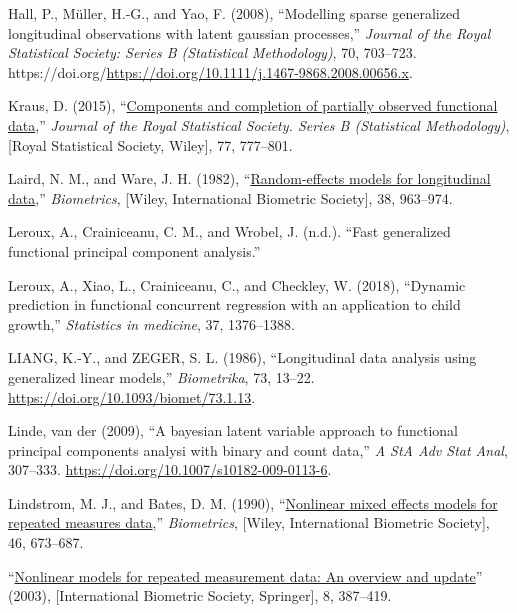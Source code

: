 \documentclass[
  11pt,
]{article}
\newlength{\cslhangindent}
\newlength{\cslentryspacingunit} %
\newenvironment{CSLReferences}[2] %
 {%
  \setlength{\parindent}{0pt}
  \ifodd #1
  \let\oldpar\par
  \def\par{\hangindent=\cslhangindent\oldpar}
  \fi
  \setlength{\parskip}{#2\cslentryspacingunit}
 }%
 {}
\begin{document}
\begin{CSLReferences}{1}{0}
\leavevmode{}%
Hall, P., Müller, H.-G., and Yao, F. (2008), {``Modelling sparse
generalized longitudinal observations with latent gaussian processes,''}
\emph{Journal of the Royal Statistical Society: Series B (Statistical
Methodology)}, 70, 703--723.
https://doi.org/\url{https://doi.org/10.1111/j.1467-9868.2008.00656.x}.

\leavevmode{}%
Kraus, D. (2015),
{``\href{http://www.jstor.org/stable/24775309}{Components and completion
of partially observed functional data},''} \emph{Journal of the Royal
Statistical Society. Series B (Statistical Methodology)}, {[}Royal
Statistical Society, Wiley{]}, 77, 777--801.

\leavevmode{}%
Laird, N. M., and Ware, J. H. (1982),
{``\href{http://www.jstor.org/stable/2529876}{Random-effects models for
longitudinal data},''} \emph{Biometrics}, {[}Wiley, International
Biometric Society{]}, 38, 963--974.

\leavevmode{}%
Leroux, A., Crainiceanu, C. M., and Wrobel, J. (n.d.). {``Fast
generalized functional principal component analysis.''}

\leavevmode{}%
Leroux, A., Xiao, L., Crainiceanu, C., and Checkley, W. (2018),
{``Dynamic prediction in functional concurrent regression with an
application to child growth,''} \emph{Statistics in medicine}, 37,
1376--1388.

\leavevmode{}%
LIANG, K.-Y., and ZEGER, S. L. (1986), {``Longitudinal data analysis
using generalized linear models,''} \emph{Biometrika}, 73, 13--22.
\url{https://doi.org/10.1093/biomet/73.1.13}.

\leavevmode{}%
Linde, van der (2009), {``A bayesian latent variable approach to
functional principal components analysi with binary and count data,''}
\emph{A StA Adv Stat Anal}, 307--333.
\url{https://doi.org/10.1007/s10182-009-0113-6}.

\leavevmode{}%
Lindstrom, M. J., and Bates, D. M. (1990),
{``\href{http://www.jstor.org/stable/2532087}{Nonlinear mixed effects
models for repeated measures data},''} \emph{Biometrics}, {[}Wiley,
International Biometric Society{]}, 46, 673--687.

\leavevmode{}%
{``\href{http://www.jstor.org/stable/1400665}{Nonlinear models for
repeated measurement data: An overview and update}''} (2003),
{[}International Biometric Society, Springer{]}, 8, 387--419.


\end{CSLReferences}
\end{document}
